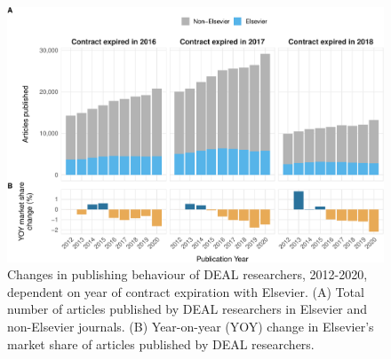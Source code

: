 \documentclass[
]{article}
\begin{document}
\begin{figure}

{\centering \includegraphics[width=0.75\linewidth]{analysis_files/figure-latex/items-publisher-year-cancellation-1} 

}

\caption{Changes in publishing behaviour of DEAL researchers, 2012-2020, dependent on year of contract expiration with Elsevier. (A) Total number of articles published by DEAL researchers in Elsevier and non-Elsevier journals. (B) Year-on-year (YOY) change in Elsevier's market share of articles published by DEAL researchers.}\label{fig:items-publisher-year-cancellation}
\end{figure}
\end{document}
